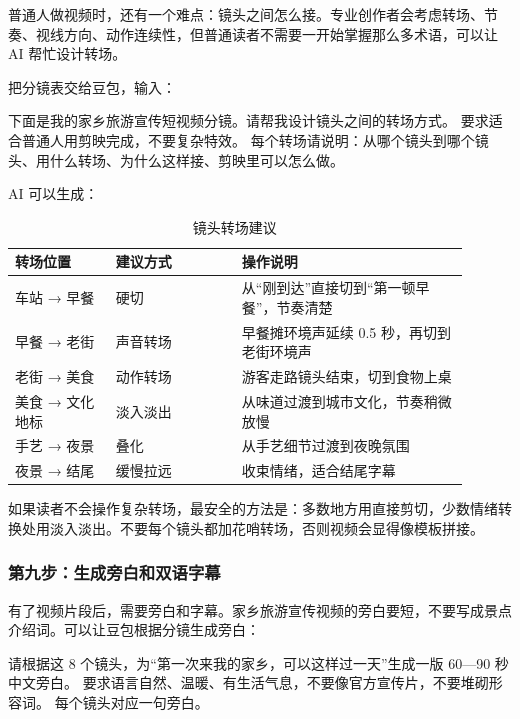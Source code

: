 普通人做视频时，还有一个难点：镜头之间怎么接。专业创作者会考虑转场、节奏、视线方向、动作连续性，但普通读者不需要一开始掌握那么多术语，可以让 AI 帮忙设计转场。

把分镜表交给豆包，输入：

\begin{tcolorbox}[promptbox]
下面是我的家乡旅游宣传短视频分镜。请帮我设计镜头之间的转场方式。
要求适合普通人用剪映完成，不要复杂特效。
每个转场请说明：从哪个镜头到哪个镜头、用什么转场、为什么这样接、剪映里可以怎么做。
\end{tcolorbox}

AI 可以生成：

\begin{table}[H]
\centering
\caption{镜头转场建议}
\label{tab:video-transition-suggestions}
\begin{tabular}{p{0.20\linewidth} p{0.25\linewidth} p{0.45\linewidth}}
\toprule
\textbf{转场位置} & \textbf{建议方式} & \textbf{操作说明} \\
\midrule
车站 → 早餐 & 硬切 & 从“刚到达”直接切到“第一顿早餐”，节奏清楚 \\
早餐 → 老街 & 声音转场 & 早餐摊环境声延续 0.5 秒，再切到老街环境声 \\
老街 → 美食 & 动作转场 & 游客走路镜头结束，切到食物上桌 \\
美食 → 文化地标 & 淡入淡出 & 从味道过渡到城市文化，节奏稍微放慢 \\
手艺 → 夜景 & 叠化 & 从手艺细节过渡到夜晚氛围 \\
夜景 → 结尾 & 缓慢拉远 & 收束情绪，适合结尾字幕 \\
\bottomrule
\end{tabular}
\end{table}

如果读者不会操作复杂转场，最安全的方法是：多数地方用直接剪切，少数情绪转换处用淡入淡出。不要每个镜头都加花哨转场，否则视频会显得像模板拼接。

\subsubsection*{第九步：生成旁白和双语字幕}

有了视频片段后，需要旁白和字幕。家乡旅游宣传视频的旁白要短，不要写成景点介绍词。可以让豆包根据分镜生成旁白：

\begin{tcolorbox}[promptbox]
请根据这 8 个镜头，为“第一次来我的家乡，可以这样过一天”生成一版 60—90 秒中文旁白。
要求语言自然、温暖、有生活气息，不要像官方宣传片，不要堆砌形容词。
每个镜头对应一句旁白。
\end{tcolorbox}

